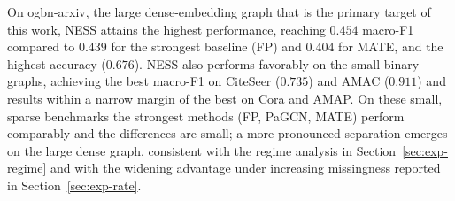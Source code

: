 On ogbn-arxiv, the large dense-embedding graph that is the primary target of this work, NESS attains the highest performance, reaching $0.454$ macro-F1 compared to $0.439$ for the strongest baseline (FP) and $0.404$ for MATE, and the highest accuracy ($0.676$). NESS also performs favorably on the small binary graphs, achieving the best macro-F1 on CiteSeer ($0.735$) and AMAC ($0.911$) and results within a narrow margin of the best on Cora and AMAP. On these small, sparse benchmarks the strongest methods (FP, PaGCN, MATE) perform comparably and the differences are small; a more pronounced separation emerges on the large dense graph, consistent with the regime analysis in Section~\ref{sec:exp-regime} and with the widening advantage under increasing missingness reported in Section~\ref{sec:exp-rate}.

\begin{table}[t]
\centering
\caption{Main comparison under random missingness at rate $0.4$. Each cell reports macro-F1 / accuracy on masked nodes, averaged over three seeds. Best macro-F1 per dataset in \textbf{bold}.}
\label{tab:main}
\end{table}





